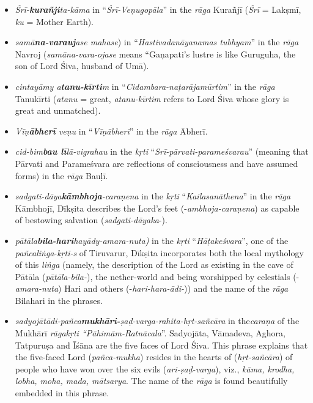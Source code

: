 \begin{itemize}
\itemsep=0pt

 \item \textit{Śrī-\textbf{kurañji}ta-kāma} in “\textit{Śrī-Veṇugopāla}” in the \textit{rāga} Kurañjī (\textit{Śrī} = Lakṣmī, \textit{ku} = Mother Earth).

 \item \textit{samā\textbf{na-varauj}ase mahase}) in “\textit{Hastivadanāyanamas tubhyam}” in the \textit{rāga} Navroj (\textit{samāna-vara-ojase} means “Gaṇapati’s lustre is like Guruguha, the son of Lord Śiva, husband of Umā).

 \item \textit{cintayāmy a\textbf{tanu-kīrti}m} in “\textit{Cidambara-naṭarājamūrtim}” in the \textit{rāga} Tanukīrti (\textit{atanu} = great, \textit{atanu-kīrtim} refers to Lord Śiva whose glory is great and unmatched).

 \item \textit{Vīṇ\textbf{ābherī} veṇu} in “\textit{Vīṇābherī}” in the \textit{rāga} Ābherī.

 \item \textit{cid-bim\textbf{bau lī}lā-vigrahau} in the \textit{kṛti} “\textit{Srī-pārvati-parameśvarau}” (meaning that Pārvati and Parameśvara are reflections of consciousness and have assumed forms) in the \textit{rāga} Bauḷī.

 \item \textit{sadgati-dāya\textbf{kāmbhoja}-caraṇena} in the \textit{kṛti} “\textit{Kailasanāthena}” in the \textit{rāga} Kāmbhojī, Dīkṣita describes the Lord’s feet (-\textit{ambhoja-caraṇena}) as capable of bestowing salvation (\textit{sadgati-dāyaka}-).

 \item \textit{pātāla\textbf{bila-hari}hayādy-amara-nuta)} in the \textit{kṛti} “\textit{Hāṭakeśvara}”, one of the \textit{pañcaliṅga}-\textit{kṛti-s} of Tiruvarur, Dīkṣita incorporates both the local mythology of this \textit{liṅga} (namely, the description of the Lord as existing in the cave of Pātāla (\textit{pātāla-bila-}), the nether-world and being worshipped by celestials (-\textit{amara-nuta}) Hari and others (-\textit{hari-hara-ādi-})) and the name of the \textit{rāga} Bilahari in the phrases.

 \item \textit{sadyojātādi-pañca\textbf{mukhāri-}ṣaḍ-varga-rahita-hṛt-sañcāra} in the\break \textit{caraṇa} of the Mukhārī\textit{ rāgakṛti “Pāhimām-Ratnācala}”. Sadyojāta, Vāmadeva, Aghora, Tatpuruṣa and Īśāna are the five faces of Lord Śiva. This phrase explains that the five-faced Lord (\textit{pañca-mukha}) resides in the hearts of (\textit{hṛt-sañcāra}) of people who have won over the six evils (\textit{ari-ṣaḍ-varga}), viz., \textit{kāma, krodha, lobha, moha, mada, mātsarya}. The name of the \textit{rāga} is found beautifully embedded in this phrase.


\end{itemize}
